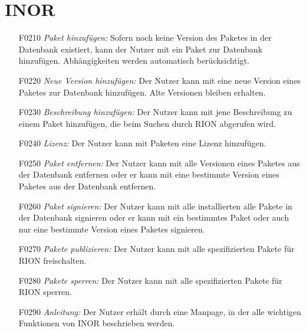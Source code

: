 \section{INOR}

\begin{itemize}
	\item[F0210] \textit{Paket hinzufügen:} Sofern noch keine Version des Paketes in der Datenbank existiert, kann der Nutzer mit  ein Paket zur Datenbank hinzufügen. Abhängigkeiten werden automatisch berücksichtigt.
	\item[F0220] \textit{Neue Version hinzufügen:} Der Nutzer kann mit  eine neue Version eines Paketes zur Datenbank hinzufügen. Alte Versionen bleiben erhalten.
	\item[F0230] \textit{Beschreibung hinzufügen:} Der Nutzer kann mit  jene Beschreibung zu einem Paket hinzufügen, die beim Suchen durch RION abgerufen wird.
	\item[F0240] \textit{Lizenz:} Der Nutzer kann mit  Paketen eine Lizenz hinzufügen.
	\item[F0250] \textit{Paket entfernen:} Der Nutzer kann mit  alle Versionen eines Paketes aus der Datenbank entfernen oder er kann mit  eine bestimmte Version eines Paketes aus der Datenbank entfernen.
	\item[F0260] \textit{Paket signieren:} Der Nutzer kann mit  alle installierten alle Pakete in der Datenbank signieren oder er kann mit  ein bestimmtes Paket oder auch nur eine bestimmte Version eines Paketes signieren.
	\item[F0270] \textit{Pakete publizieren:} Der Nutzer kann mit  alle spezifizierten Pakete für RION freischalten.
	\item[F0280] \textit{Pakete sperren:} Der Nutzer kann mit  alle spezifizierten Pakete für RION sperren.
	\item[F0290] \textit{Anleitung:} Der Nutzer erhält durch  eine Manpage, in der alle wichtigen Funktionen von INOR beschrieben werden.


\end{itemize}
